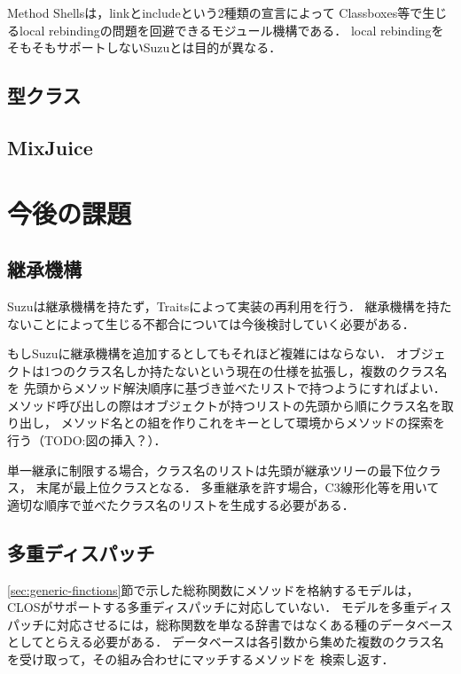 \documentclass{ipsjprosym}
\begin{document}
Method Shells\cite{Takeshita:2014-07-14}は，linkとincludeという2種類の宣言によって
Classboxes等で生じるlocal rebindingの問題を回避できるモジュール機構である．
local rebindingをそもそもサポートしないSuzuとは目的が異なる．

\subsection{型クラス}

\subsection{MixJuice}


\section{今後の課題}

\subsection{継承機構}

Suzuは継承機構を持たず，Traitsによって実装の再利用を行う．
継承機構を持たないことによって生じる不都合については今後検討していく必要がある．

もしSuzuに継承機構を追加するとしてもそれほど複雑にはならない．
オブジェクトは1つのクラス名しか持たないという現在の仕様を拡張し，複数のクラス名を
先頭からメソッド解決順序に基づき並べたリストで持つようにすればよい．
メソッド呼び出しの際はオブジェクトが持つリストの先頭から順にクラス名を取り出し，
メソッド名との組を作りこれをキーとして環境からメソッドの探索を行う（TODO:図の挿入？）．

単一継承に制限する場合，クラス名のリストは先頭が継承ツリーの最下位クラス，
末尾が最上位クラスとなる．
多重継承を許す場合，C3線形化\cite{Barrett:1996:MSL:236337.236343}等を用いて
適切な順序で並べたクラス名のリストを生成する必要がある．

\subsection{多重ディスパッチ}
\label{sec:multiple-dispatch}

\ref{sec:generic-finctions}節で示した総称関数にメソッドを格納するモデルは，
CLOSがサポートする多重ディスパッチに対応していない．
モデルを多重ディスパッチに対応させるには，総称関数を単なる辞書ではなくある種のデータベース
としてとらえる必要がある．
データベースは各引数から集めた複数のクラス名を受け取って，その組み合わせにマッチするメソッドを
検索し返す．
\end{document}
